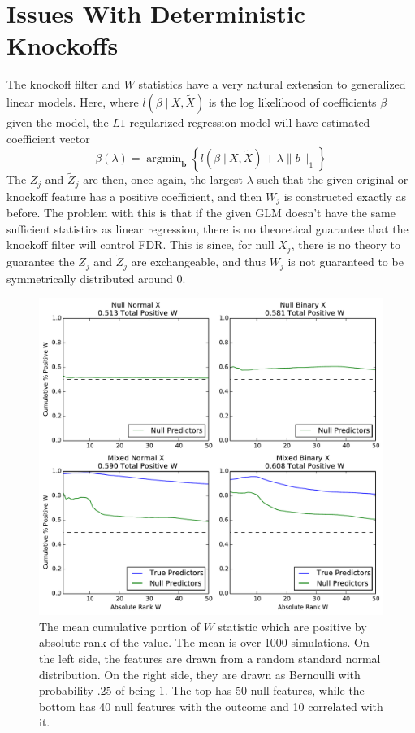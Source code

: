 \documentclass[11pt]{article}
\newcommand{\st}{ \; \big | \:}
\theoremstyle{definition}
\DeclareMathOperator*{\argmin}{arg\min}
\begin{document}
\section{Issues With Deterministic Knockoffs} 
    The knockoff filter and $W$ statistics have a very natural extension to generalized linear models. Here, where $l(\beta\st X, \tilde X)$ is the log likelihood of coefficients $\beta$ given the model, the $L1$ regularized regression model will have estimated coefficient vector
    \[ \beta(\lambda) = \argmin_\mathbf b \left\{l(\beta\st X, \tilde X) + \lambda\|b\|_1 \right\}\]
    The $Z_j$ and $\tilde Z_j$ are then, once again, the largest $\lambda$ such that the given original or knockoff feature has a positive coefficient, and then $W_j$ is constructed exactly as before. The problem with this is that if the given GLM doesn't have the same sufficient statistics as linear regression, there is no theoretical guarantee that the knockoff filter will control FDR. This is since, for null $X_j$, there is no theory to guarantee the $Z_j$ and $\tilde Z_j$ are exchangeable, and thus $W_j$ is not guaranteed to be symmetrically distributed around $0$. \par
    \begin{figure}[h]
        \begin{center}
        \includegraphics[width=14cm]{images/entryrate_original_logit}
    \end{center}
        \caption{The mean cumulative portion of $W$ statistic which are positive by absolute rank of the value. The mean is over 1000 simulations. On the left side, the features are drawn from a random standard normal distribution. On the right side, they are drawn as Bernoulli with probability $.25$ of being 1. The top has 50 null features, while the bottom has 40 null features with the outcome and 10 correlated with it.}
    \end{figure}
 
\end{document}
